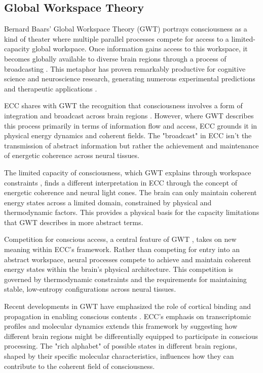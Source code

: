 \begin{refsection}
\section{Global Workspace Theory}

Bernard Baars' Global Workspace Theory (GWT) portrays consciousness as a kind of theater where multiple parallel processes compete for access to a limited-capacity global workspace. Once information gains access to this workspace, it becomes globally available to diverse brain regions through a process of broadcasting \cite{Baars1988}. This metaphor has proven remarkably productive for cognitive science and neuroscience research, generating numerous experimental predictions and therapeutic applications \cite{Dehaene2001}.

ECC shares with GWT the recognition that consciousness involves a form of integration and broadcast across brain regions \cite{Baars2002}. However, where GWT describes this process primarily in terms of information flow and access, ECC grounds it in physical energy dynamics and coherent fields. The "broadcast" in ECC isn't the transmission of abstract information but rather the achievement and maintenance of energetic coherence across neural tissues.

The limited capacity of consciousness, which GWT explains through workspace constraints \cite{Dehaene2006}, finds a different interpretation in ECC through the concept of energetic coherence and neural light cones. The brain can only maintain coherent energy states across a limited domain, constrained by physical and thermodynamic factors. This provides a physical basis for the capacity limitations that GWT describes in more abstract terms.

Competition for conscious access, a central feature of GWT \cite{Dehaene2011}, takes on new meaning within ECC's framework. Rather than competing for entry into an abstract workspace, neural processes compete to achieve and maintain coherent energy states within the brain's physical architecture. This competition is governed by thermodynamic constraints and the requirements for maintaining stable, low-entropy configurations across neural tissues.

Recent developments in GWT have emphasized the role of cortical binding and propagation in enabling conscious contents \cite{Baars2013}. ECC's emphasis on transcriptomic profiles and molecular dynamics extends this framework by suggesting how different brain regions might be differentially equipped to participate in conscious processing. The "rich alphabet" of possible states in different brain regions, shaped by their specific molecular characteristics, influences how they can contribute to the coherent field of consciousness.


\end{refsection}
